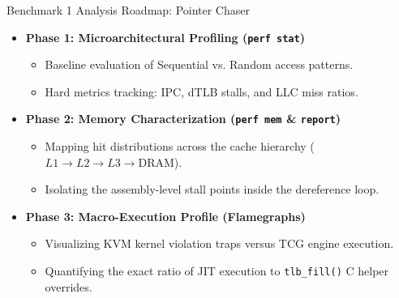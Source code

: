 \documentclass[aspectratio=169]{beamer} %
\begin{document}
  \begin{frame}{Benchmark 1 Analysis Roadmap: Pointer Chaser}
      \begin{itemize}
          \item \textbf{Phase 1: Microarchitectural Profiling (\texttt{perf stat})}
          \begin{itemize}
              \item Baseline evaluation of Sequential vs. Random access patterns.
              \item Hard metrics tracking: IPC, dTLB stalls, and LLC miss ratios.
          \end{itemize}
          
          \vspace{0.3cm}
          \item \textbf{Phase 2: Memory Characterization (\texttt{perf mem} \& \texttt{report})}
          \begin{itemize}
              \item Mapping hit distributions across the cache hierarchy ($L1 \to L2 \to L3 \to \text{DRAM}$).
              \item Isolating the assembly-level stall points inside the dereference loop.
          \end{itemize}

          \vspace{0.3cm}
          \item \textbf{Phase 3: Macro-Execution Profile (Flamegraphs)}
          \begin{itemize}
              \item Visualizing KVM kernel violation traps versus TCG engine execution.
              \item Quantifying the exact ratio of JIT execution to \texttt{tlb\_fill()} C helper overrides.
          \end{itemize}
      \end{itemize}
  \end{frame}
\end{document}
